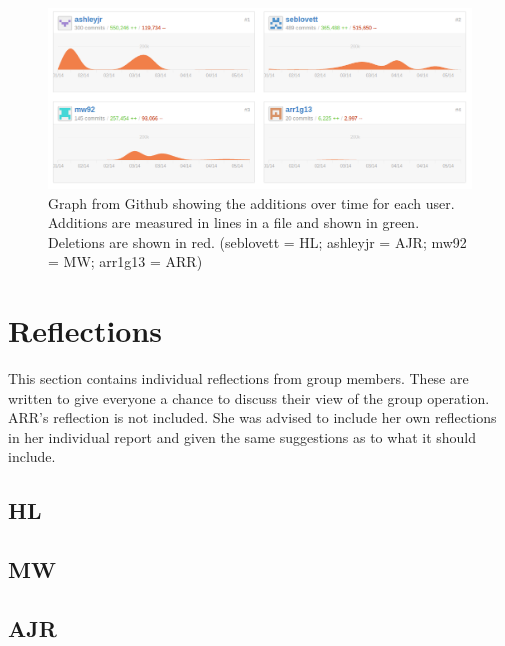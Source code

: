 \begin{figure}
\includegraphics[width=\textwidth]{Figures/gitadditions.png}
\caption{Graph from Github showing the additions over time for each user. Additions are measured in lines in a file and shown in green. Deletions are shown in red. (seblovett = HL; ashleyjr = AJR; mw92 = MW; arr1g13 = ARR)}
\label{fig:additions}
\end{figure}


\section{Reflections}

This section contains individual reflections from group members. 
These are written to give everyone a chance to discuss their view of the group operation. 
ARR's reflection is not included. 
She was advised to include her own reflections in her individual report and given the same suggestions as to what it should include.

\subsection{HL}

\subsection{MW}

\subsection{AJR}



